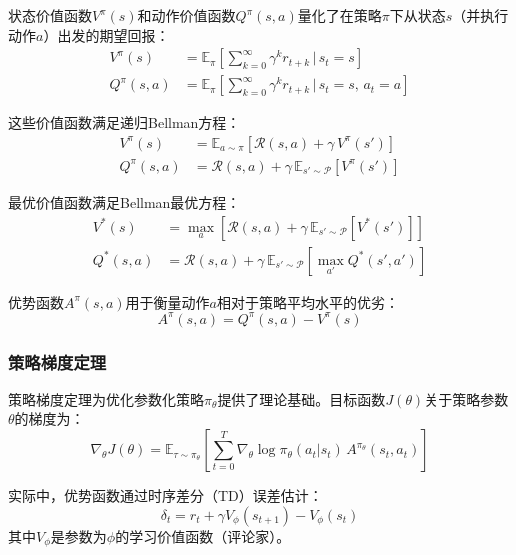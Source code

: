 状态价值函数$V^\pi(s)$和动作价值函数$Q^\pi(s, a)$量化了在策略$\pi$下从状态$s$（并执行动作$a$）出发的期望回报：
\begin{align}
    V^\pi(s) &= \mathbb{E}_{\pi} \left[ \sum_{k=0}^{\infty} \gamma^k r_{t+k} \,\Big|\, s_t = s \right] \\
    Q^\pi(s, a) &= \mathbb{E}_{\pi} \left[ \sum_{k=0}^{\infty} \gamma^k r_{t+k} \,\Big|\, s_t = s, \, a_t = a \right]
\end{align}

这些价值函数满足递归Bellman方程：
\begin{align}
    V^\pi(s) &= \mathbb{E}_{a \sim \pi} \left[ \mathcal{R}(s, a) + \gamma \, V^\pi(s') \right] \\
    Q^\pi(s, a) &= \mathcal{R}(s, a) + \gamma \, \mathbb{E}_{s' \sim \mathcal{P}} \left[ V^\pi(s') \right]
\end{align}

最优价值函数满足Bellman最优方程：
\begin{align}
    V^*(s) &= \max_{a} \left[ \mathcal{R}(s, a) + \gamma \, \mathbb{E}_{s' \sim \mathcal{P}} \left[ V^*(s') \right] \right] \\
    Q^*(s, a) &= \mathcal{R}(s, a) + \gamma \, \mathbb{E}_{s' \sim \mathcal{P}} \left[ \max_{a'} Q^*(s', a') \right]
\end{align}

优势函数$A^\pi(s, a)$用于衡量动作$a$相对于策略平均水平的优劣：
\begin{equation}
    A^\pi(s, a) = Q^\pi(s, a) - V^\pi(s)
\end{equation}

\subsubsection{策略梯度定理}
\label{subsec:policy_gradient}

策略梯度定理为优化参数化策略$\pi_\theta$提供了理论基础。目标函数$J(\theta)$关于策略参数$\theta$的梯度为：
\begin{equation}
    \nabla_\theta J(\theta) = \mathbb{E}_{\tau \sim \pi_\theta} \left[ \sum_{t=0}^{T} \nabla_\theta \log \pi_\theta(a_t | s_t) \, A^{\pi_\theta}(s_t, a_t) \right]
\end{equation}

实际中，优势函数通过时序差分（TD）误差估计：
\begin{equation}
    \delta_t = r_t + \gamma V_\phi(s_{t+1}) - V_\phi(s_t)
\end{equation}
其中$V_\phi$是参数为$\phi$的学习价值函数（评论家）。


